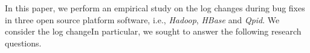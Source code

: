 
%
%
%

In this paper, we perform an empirical study on the log changes during bug fixes in three open source platform software, i.e., \emph{Hadoop}, \emph{HBase} and \emph{Qpid}. We consider the log changeIn particular, we sought to answer the following research questions. 

